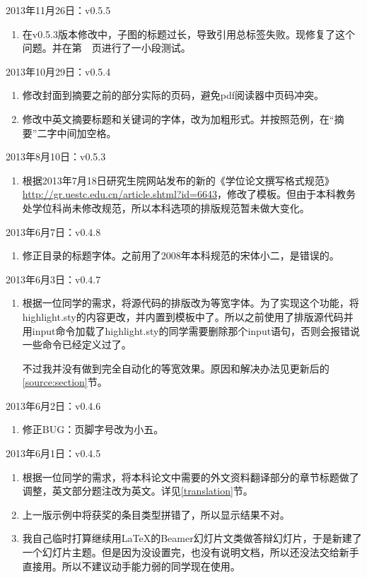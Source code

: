 \noindent
2013年11月26日：v0.5.5
\begin{enumerate}
\item 在v0.5.3版本修改中，子图的标题过长，导致引用总标签失败。现修复了这个问题。并在第~\pageref{testpicslabel}~页进行了一小段测试。
\end{enumerate}

\noindent
2013年10月29日：v0.5.4
\begin{enumerate}
\item 修改封面到摘要之前的部分实际的页码，避免pdf阅读器中页码冲突。
\item 修改中英文摘要标题和关键词的字体，改为加粗形式。并按照范例，在“摘要”二字中间加空格。
\end{enumerate}

\noindent
2013年8月10日：v0.5.3
\begin{enumerate}
\item 根据2013年7月18日研究生院网站发布的新的《学位论文撰写格式规范》\url{http://gr.uestc.edu.cn/article.shtml?id=6643}，修改了模板。但由于本科教务处学位科尚未修改规范，所以本科选项的排版规范暂未做大变化。
\end{enumerate}

\noindent
2013年6月7日：v0.4.8
\begin{enumerate}
\item 修正目录的标题字体。之前用了2008年本科规范的宋体小二，是错误的。
\end{enumerate}

\noindent
2013年6月3日：v0.4.7
\begin{enumerate}
\item 根据一位同学的需求，将源代码的排版改为等宽字体。为了实现这个功能，将highlight.sty的内容更改，并内置到模板中了。所以之前使用了排版源代码并用input命令加载了highlight.sty的同学需要删除那个input语句，否则会报错说一些命令已经定义过了。

    不过我并没有做到完全自动化的等宽效果。原因和解决办法见更新后的\ref{source:section}节。
\end{enumerate}

\noindent
2013年6月2日：v0.4.6
\begin{enumerate}
\item 修正BUG：页脚字号改为小五。
\end{enumerate}

\noindent
2013年6月1日：v0.4.5
\begin{enumerate}
\item 根据一位同学的需求，将本科论文中需要的外文资料翻译部分的章节标题做了调整，英文部分题注改为英文。详见\ref{translation}节。
\item 上一版示例中将获奖的条目类型拼错了，所以显示结果不对。
\item 我自己临时打算继续用LaTeX的Beamer幻灯片文类做答辩幻灯片，于是新建了一个幻灯片主题。但是因为没设置完，也没有说明文档，所以还没法交给新手直接用。所以不建议动手能力弱的同学现在使用。
\end{enumerate}

